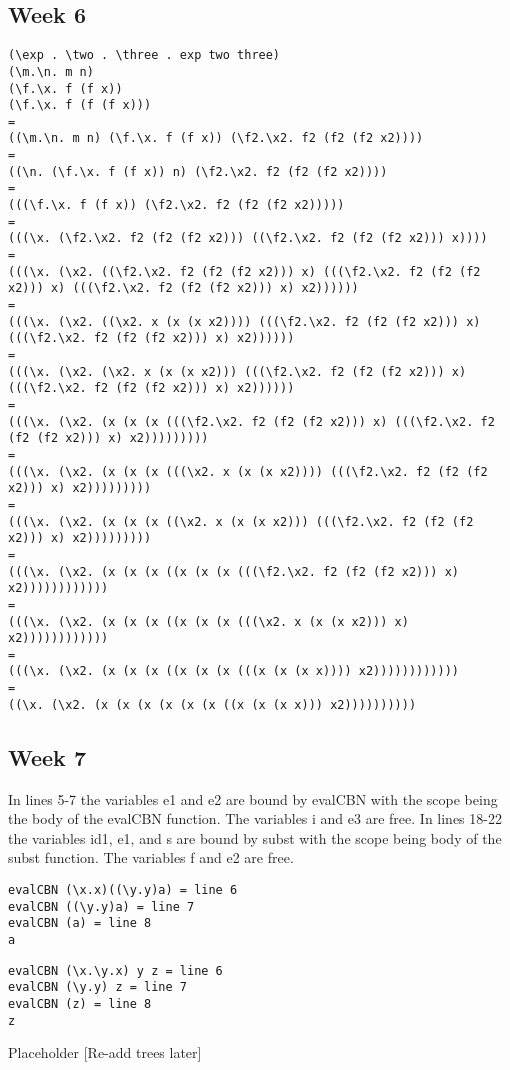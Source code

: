 \documentclass{article}
\theoremstyle{theorem}
\theoremstyle{definition}
\theoremstyle{remark}
\begin{document}
\subsection{Week 6}
\begin{lstlisting}
(\exp . \two . \three . exp two three)
(\m.\n. m n)
(\f.\x. f (f x))
(\f.\x. f (f (f x)))
=
((\m.\n. m n) (\f.\x. f (f x)) (\f2.\x2. f2 (f2 (f2 x2))))
=
((\n. (\f.\x. f (f x)) n) (\f2.\x2. f2 (f2 (f2 x2))))
=
(((\f.\x. f (f x)) (\f2.\x2. f2 (f2 (f2 x2)))))
=
(((\x. (\f2.\x2. f2 (f2 (f2 x2))) ((\f2.\x2. f2 (f2 (f2 x2))) x))))
=
(((\x. (\x2. ((\f2.\x2. f2 (f2 (f2 x2))) x) (((\f2.\x2. f2 (f2 (f2 x2))) x) (((\f2.\x2. f2 (f2 (f2 x2))) x) x2))))))
=
(((\x. (\x2. ((\x2. x (x (x x2)))) (((\f2.\x2. f2 (f2 (f2 x2))) x) (((\f2.\x2. f2 (f2 (f2 x2))) x) x2))))))
=
(((\x. (\x2. (\x2. x (x (x x2))) (((\f2.\x2. f2 (f2 (f2 x2))) x) (((\f2.\x2. f2 (f2 (f2 x2))) x) x2))))))
=
(((\x. (\x2. (x (x (x (((\f2.\x2. f2 (f2 (f2 x2))) x) (((\f2.\x2. f2 (f2 (f2 x2))) x) x2)))))))))
=
(((\x. (\x2. (x (x (x (((\x2. x (x (x x2)))) (((\f2.\x2. f2 (f2 (f2 x2))) x) x2)))))))))
=
(((\x. (\x2. (x (x (x ((\x2. x (x (x x2))) (((\f2.\x2. f2 (f2 (f2 x2))) x) x2)))))))))
=
(((\x. (\x2. (x (x (x ((x (x (x (((\f2.\x2. f2 (f2 (f2 x2))) x) x2))))))))))))
=
(((\x. (\x2. (x (x (x ((x (x (x (((\x2. x (x (x x2))) x) x2))))))))))))
=
(((\x. (\x2. (x (x (x ((x (x (x (((x (x (x x)))) x2))))))))))))
=
((\x. (\x2. (x (x (x (x (x (x ((x (x (x x))) x2))))))))))
\end{lstlisting}

\subsection{Week 7}

In lines 5-7 the variables e1 and e2 are bound by evalCBN with the scope being the body of the evalCBN function. The variables i and e3 are free. In lines 18-22 the variables id1, e1, and s are bound by subst with the scope being body of the subst function. The variables f and e2 are free.

\begin{lstlisting}
evalCBN (\x.x)((\y.y)a) = line 6
evalCBN ((\y.y)a) = line 7
evalCBN (a) = line 8
a
\end{lstlisting}
\begin{lstlisting}
evalCBN (\x.\y.x) y z = line 6
evalCBN (\y.y) z = line 7
evalCBN (z) = line 8
z
\end{lstlisting}

Placeholder [Re-add trees later]
\end{document}
